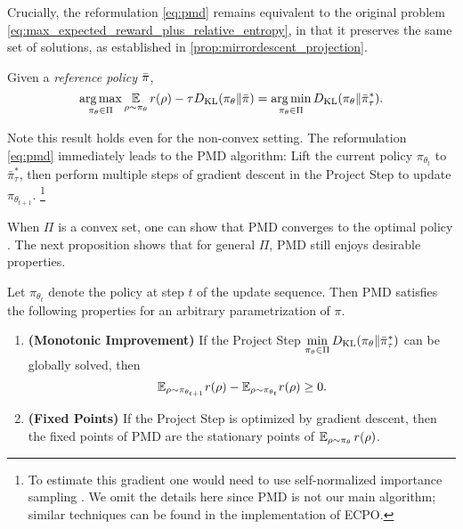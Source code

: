 Crucially, the reformulation \cref{eq:pmd} remains equivalent to the
original problem \cref{eq:max_expected_reward_plus_relative_entropy},
in that it preserves the same set of solutions,
as established in \cref{prop:mirrordescent_projection}.

\begin{prop}
\label{prop:mirrordescent_projection}
Given a \emph{reference policy} $\bar{\pi}$,
{\small
\begin{equation*}
	\operatorname*{arg\,max}\limits_{\pi_\theta \in \Pi} { \operatorname*{\mathbb{E}}\limits_{\rho \sim \pi_\theta}{  r(\rho)  - \tau D_{\mathrm{KL}}(\pi_\theta \| \bar{\pi}) } } 
 = \operatorname*{arg\,min}\limits_{\pi_\theta \in \Pi}{ D_{\mathrm{KL}}(\pi_\theta \| \bar{\pi}_\tau^*) }.
\end{equation*}
}
\end{prop}
Note this result holds even for the non-convex setting. The reformulation \cref{eq:pmd} immediately leads to the PMD algorithm: Lift the current policy $\pi_{\theta_t}$ to $\bar{\pi}_\tau^*$,
then perform multiple steps of gradient descent in the Project Step
to update $\pi_{\theta_{t+1}}$.%
\footnote{
To estimate this gradient one would need to use self-normalized importance
sampling \cite{owen2013monte}.
We omit the details here since PMD is not our main algorithm;
similar techniques can be found in the implementation of ECPO. 
}

When $\Pi$ is a convex set, one can show that PMD converges to the optimal policy \citep{nemirovskii1983problem,beck2003mirror}. 
The next proposition shows that for general $\Pi$,
PMD still enjoys desirable properties.

\begin{prop}
\label{prop:monoto_policymirrordescent}
Let $\pi_{\theta_{t}}$ denote the policy at step $t$ of
the update sequence.
Then PMD satisfies the following properties for an arbitrary 
parametrization of $\pi$.
\begin{enumerate}
	\item {\bf (Monotonic Improvement)} 
	If the Project Step $\min\limits_{\pi_\theta \in \Pi}{D_{\mathrm{KL}}( \pi_\theta \| \bar{\pi}_{\tau}^* )}$ can be globally solved, then
	 \begin{equation*}
	{\mathbb{E}}_{\rho \sim \pi_{\theta_{t+1}}}{r(\rho)} - {\mathbb{E}}_{\rho \sim \pi_{\theta_{t}}}{  r(\rho)} \ge 0.
	\end{equation*}
	\item {\bf (Fixed Points)} If the Project Step is optimized by gradient descent, then the fixed points of PMD are the 
	 stationary points of $\operatorname{\mathbb{E}}_{\rho \sim \pi_\theta}{  r(\rho)}$. 
\end{enumerate}
\end{prop}

